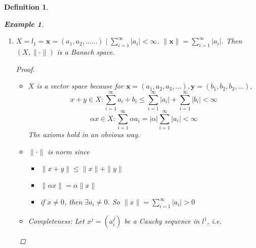 \documentclass{article}
\newtheorem*{definition}{Definition}
\newtheorem*{remark}{Remark}
\newtheorem*{example}{Example}
\begin{document}
\begin{definition}
\begin{example}
\begin{enumerate}
\[            \] 
            $f_n$ is actually a Cauchy sequence in $(X, d_1)$, since \\
            $d_1(f_n, f_m) \le d_1(f_n, f_0) + d_1(f_0, f_m) \le \frac{1}{2n} + \frac{1}{2m}$.
            Conclusion: $(C([0, 1]), d_1)$ is NOT complete.
            \begin{remark}
                $C([0, 1]) \subset L^1([0, 1])$ and we will see $(L^1, d_1)$ is complete.
            \end{remark}
            In general, for any incomplete metric space $(X, d)$, it is possible to construct a complete metric space
            $(\overline{X}, \overline{d})$ so that $X$ is dense(we will define this next time) in $\overline{X}$ and
            $\overline{d}|_X = d$.
            The procedure is the same as $\mathbb{Q} \rightarrow \mathbb{R}$.
            See HW next time.
            \item $X = l_1 = {\mathbf{x}=(a_1, a_2, ......)\mid\sum_{i=1}^{\infty}{|a_i| < \infty}}$.
            $\|\mathbf{x}\| = \sum_{i=1}^{\infty}{|a_i|}$. Then $(X, \|\cdot\|)$ is a Banach space.
            \begin{proof} \hfill
                \begin{itemize}
                    \item $X$ is a vector space because for 
                    $\mathbf{x}=(a_1, a_2, a_3, ...), \mathbf{y}=(b_1, b_2, b_3, ...)$,
                    \[
                    x + y \in X: \sum_{i=1}^{\infty}{a_i + b_i} \le \sum_{i=1}^{\infty}{|a_i|} + \sum_{i=1}^{\infty}{|b_i|} < \infty
                    \]
                    \[
                    \alpha x \in X: \sum_{i=1}^{\infty}{\alpha a_i} = |\alpha|\sum_{i=1}^{\infty}{|a_i| < \infty}
                    \]
                    The axioms hold in an obvious way.
                    \item $\|\cdot\|$ is norm since
                    \begin{itemize}
                        \item $\|x + y\| \le \|x\| + \|y\|$
                        \item $\|\alpha x\| = \alpha \|x\|$
                        \item if $x \ne 0$, then $\exists a_i \ne 0$. So $\|x\| = \sum_{i=1}^{\infty}{|a_i|} > 0$
                    \end{itemize}
                    \item Completeness:
                    Let $x^j = (a_i^j)$ be a Cauchy sequence in $l^1$, i.e.

\end{itemize}
\end{proof}
\end{enumerate}
\end{example}
\end{definition}
\end{document}
